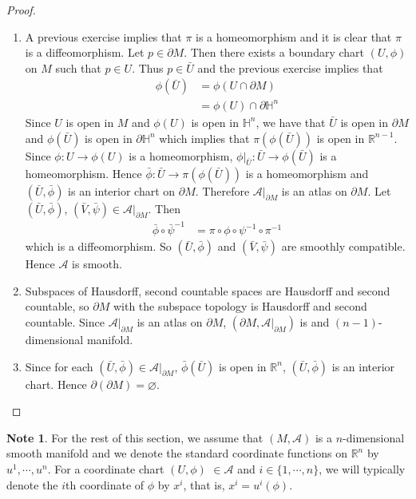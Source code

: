 \documentclass{book}
\theoremstyle{definition}
\newtheorem{note}[definition]{Note}
\renewcommand{\H}{\mathbb{H}}
\newcommand{\R}{\mathbb{R}}
\newcommand{\MA}{\mathcal{A}}
\DeclareMathOperator*{\0}{\mbf{0}}
\DeclareMathOperator*{\1}{\mbf{1}}
\newcommand{\p}{\partial}
\begin{document}
	\begin{proof} \
		\begin{enumerate}
			\item A previous exercise implies that $\pi$ is a homeomorphism and it is clear that $\pi$ is a diffeomorphism. Let $p \in \partial M$. Then there exists a boundary chart $(U, \phi)$ on $M$ such that $p \in U$. Thus $p \in \bar{U}$ and the previous exercise implies that 
				\begin{align*}
				\phi(\bar{U}) 
				& = \phi (U \cap \p M) \\
				& = \phi(U) \cap \p \H^n 
			\end{align*}
			Since $U$ is open in $M$ and $\phi(U)$ is open in $\H^n$, we have that $\bar{U}$ is open in $\p M$ and $\phi(\bar{U})$ is open in $\p \H^n$ which implies that $\pi(\phi(\bar{U}))$ is open in $\R^{n-1}$. Since $\phi: U \rightarrow \phi(U)$ is a homeomorphism, $\phi|_{\bar{U}}: \bar{U} \rightarrow \phi(\bar{U})$ is a homeomorphism. Hence $\bar{\phi}: \bar{U} \rightarrow \pi(\phi(\bar{U}))$ is a homeomorphism and $(\bar{U}, \bar{\phi})$ is an interior chart on $\p M$. Therefore $\MA|_{\p M }$ is an atlas on $\p M$. Let $(\bar{U}, \bar{\phi})$, $(\bar{V}, \bar{\psi}) \in \MA|_{\p M}$. Then 
			\begin{align*}
				\bar{\phi} \circ \bar{\psi}^{-1}
				& = \pi \circ \phi \circ \psi^{-1} \circ \pi^{-1}
			\end{align*}
			which is a diffeomorphism. So $(\bar{U}, \bar{\phi})$ and $(\bar{V}, \bar{\psi})$ are smoothly compatible. Hence $\MA$ is smooth.
			\\
			\item Subspaces of Hausdorff, second countable spaces are Hausdorff and second countable, so $\p M$ with the subspace topology is Hausdorff and second countable. Since  $\MA|_{\p M }$ is an atlas on $\p M$, $(\p M,  \MA|_{\p M })$ is and $(n-1)$-dimensional manifold. \\
			\item Since for each $(\bar{U}, \bar{\phi}) \in \MA|_{\p M}$, $\bar{\phi}(\bar{U})$ is open in $\R^n$, $(\bar{U}, \bar{\phi})$ is an interior chart. Hence $\p(\p M) = \varnothing$.
		\end{enumerate}
	\end{proof}

	
	
	\begin{note}
		For the rest of this section, we assume that $(M, \MA)$ is a $n$-dimensional smooth manifold and we denote the standard coordinate functions on $\R^n$ by $u^1, \cdots, u^n$. For a coordinate chart $(U, \phi)$ $\in \MA$ and $i \in \{1, \cdots, n\}$, we will typically denote the $i$th coordinate of $\phi$ by $x^i$, that is,  $x^i = u^i(\phi)$.
	\end{note}
	
\end{document}
